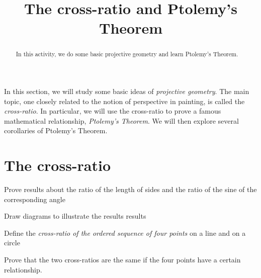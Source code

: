 \documentclass[newpage,hints,handout]{ximera}
\title{The cross-ratio and Ptolemy's Theorem}
\begin{document}
\begin{abstract}
In this activity, we do some basic projective geometry and learn
Ptolemy's Theorem.
\end{abstract}
\maketitle

In this section, we will study some basic ideas of \textit{projective
  geometry}. The main topic, one closely related to the notion of
perspective in painting, is called the \textit{cross-ratio}.  In
particular, we will use the cross-ratio to prove a famous mathematical
relationship, \textit{Ptolemy's Theorem}. We will then explore several
corollaries of Ptolemy's Theorem.

\section{The cross-ratio}
\begin{listOutcomes}
\item Prove results about the ratio of the length of sides and the ratio of the sine of the corresponding angle
 \item Draw diagrams to illustrate the results results
\item Define the \emph{cross-ratio of the ordered sequence of four points} on a line and on a circle
\item Prove that the two cross-ratios are the same if the four points have a certain relationship.
\end{listOutcomes}
\vfill\pagebreak
\end{document}
